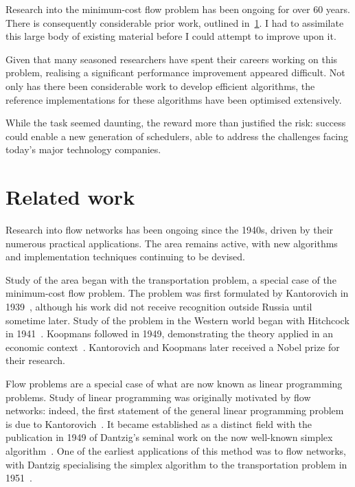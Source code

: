 Research into the minimum-cost flow problem has been ongoing for over 60 years. There is consequently considerable prior work, outlined in~\cref{sec:intro-related-work}. I had to assimilate this large body of existing material before I could attempt to improve upon it.

Given that many seasoned researchers have spent their careers working on this problem, realising a significant performance improvement appeared difficult. Not only has there been considerable work to develop efficient algorithms, the reference implementations for these algorithms have been optimised extensively.

While the task seemed daunting, the reward more than justified the risk: success could enable a new generation of schedulers, able to address the challenges facing today's major technology companies.

\section{Related work} \label{sec:intro-related-work}

Research into flow networks has been ongoing since the 1940s, driven by their numerous practical applications. The area remains active, with new algorithms and implementation techniques continuing to be devised.

Study of the area began with the transportation problem, a special case of the minimum-cost flow problem. The problem was first formulated by Kantorovich in 1939~\cite{Kantorovich:1960}, although his work did not receive recognition outside Russia until sometime later. Study of the problem in the Western world began with Hitchcock in 1941~\cite{Hitchcock:1941}. Koopmans followed in 1949, demonstrating the theory applied in an economic context~\cite{Koopmans:1949}. Kantorovich and Koopmans later received a Nobel prize for their research\footnotemark.

Flow problems are a special case of what are now known as linear programming problems. Study of linear programming was originally motivated by flow networks: indeed, the first statement of the general linear programming problem is due to Kantorovich~\cite{Kantorovich:1960}. It became established as a distinct field with the publication in 1949 of Dantzig's seminal work on the now well-known simplex algorithm~\cite{Dantzig:1949}. One of the earliest applications of this method was to flow networks, with Dantzig specialising the simplex algorithm to the transportation problem in 1951~\cite{Dantzig:1951}.

